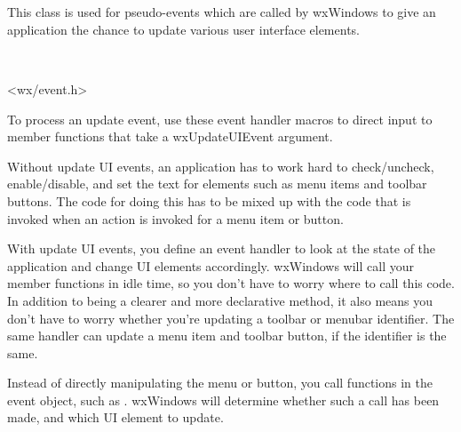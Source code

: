 \section{}\label{wxupdateuievent}

This class is used for pseudo-events which are called by wxWindows
to give an application the chance to update various user interface elements.


\\


<wx/event.h>


To process an update event, use these event handler macros to direct input to member
functions that take a wxUpdateUIEvent argument.

\twocolwidtha{7cm}
\begin{twocollist}\itemsep=0pt
\end{twocollist}%


Without update UI events, an application has to work hard to check/uncheck, enable/disable,
and set the text for elements such as menu items and toolbar buttons.
The code for doing this has to be mixed up with the code that is invoked when
an action is invoked for a menu item or button.

With update UI events, you define an event handler to look at the state of
the application and change UI elements accordingly. wxWindows will call your
member functions in idle time, so you don't have to worry where to call this code.
In addition to being a clearer and more declarative method, it also means you
don't have to worry whether you're updating a toolbar or menubar identifier.
The same handler can update a menu item and toolbar button, if the identifier is the same.

Instead of directly manipulating the menu or button, you call functions in the event
object, such as . wxWindows
will determine whether such a call has been made, and which UI element to update.

